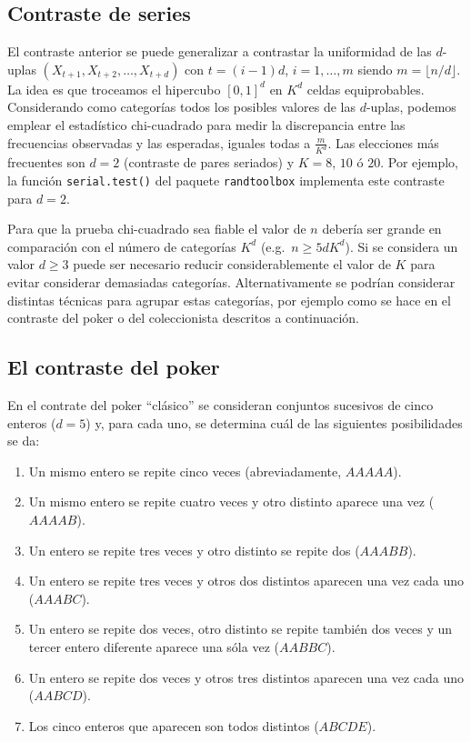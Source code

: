 \documentclass[
]{book}
\theoremstyle{break}
\theoremstyle{nonumberplain}
\begin{document}
\hypertarget{contraste-de-series}{%
\subsection{Contraste de series}\label{contraste-de-series}}

El contraste anterior se puede generalizar a contrastar la uniformidad de las \(d\)-uplas \((X_{t+1},X_{t+2},\ldots,X_{t+d})\) con \(t=(i-1)d\), \(i=1,\ldots,m\) siendo \(m=\lfloor n/d \rfloor\).
La idea es que troceamos el hipercubo \([0, 1]^d\) en \(K^d\) celdas equiprobables.
Considerando como categorías todos los posibles valores de las \(d\)-uplas, podemos emplear el estadístico chi-cuadrado para medir la discrepancia entre las frecuencias observadas y las esperadas, iguales todas a \(\frac{m}{K^d}\).
Las elecciones más frecuentes son \(d=2\) (contraste de pares seriados) y \(K=8\), \(10\) ó \(20\).
Por ejemplo, la función \texttt{serial.test()} del paquete \texttt{randtoolbox} implementa este contraste para \(d=2\).

Para que la prueba chi-cuadrado sea fiable el valor de \(n\) debería ser grande en comparación con el número de categorías \(K^d\) (e.g.~\(n \geq 5dK^d\)).
Si se considera un valor \(d \geq 3\) puede ser necesario reducir considerablemente el valor de \(K\) para evitar considerar demasiadas categorías.
Alternativamente se podrían considerar distintas técnicas para agrupar estas categorías, por ejemplo como se hace en el contraste del poker o del coleccionista descritos a continuación.

\hypertarget{el-contraste-del-poker}{%
\subsection{El contraste del poker}\label{el-contraste-del-poker}}

En el contrate del poker ``clásico'' se consideran conjuntos sucesivos de cinco enteros (\(d=5\)) y, para cada uno, se determina cuál de las siguientes posibilidades se da:

\begin{enumerate}
\def\labelenumi{\arabic{enumi}.}
\item
  Un mismo entero se repite cinco veces (abreviadamente, \(AAAAA\)).
\item
  Un mismo entero se repite cuatro veces y otro distinto aparece una
  vez (\(AAAAB\)).
\item
  Un entero se repite tres veces y otro distinto se repite dos
  (\(AAABB\)).
\item
  Un entero se repite tres veces y otros dos distintos aparecen una
  vez cada uno (\(AAABC\)).
\item
  Un entero se repite dos veces, otro distinto se repite también dos
  veces y un tercer entero diferente aparece una sóla vez (\(AABBC\)).
\item
  Un entero se repite dos veces y otros tres distintos aparecen una
  vez cada uno (\(AABCD\)).
\item
  Los cinco enteros que aparecen son todos distintos (\(ABCDE\)).
\end{enumerate}
\end{document}
